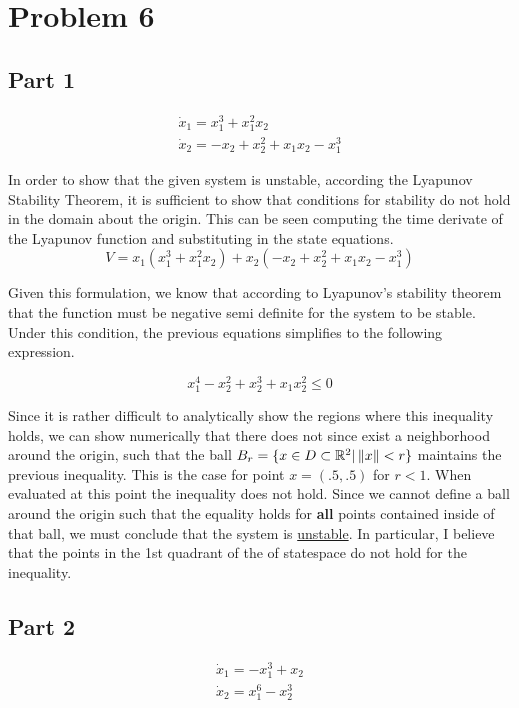 \section{Problem 6}

\subsection*{Part 1}
$$
\begin{array}{l}
\dot{x}_{1}=x_{1}^{3}+x_{1}^{2} x_{2} \\
\dot{x}_{2}=-x_{2}+x_{2}^{2}+x_{1} x_{2}-x_{1}^{3}
\end{array}
$$

\noindent In order to show that the given system is unstable, according the Lyapunov Stability Theorem, it is sufficient to show that conditions for stability do not hold in the domain about the origin. This can be seen computing the time derivate of the Lyapunov function and substituting in the state equations.
$$
V=x_{1}\left(x_{1}^{3}+x_{1}^{2} x_{2}\right)+x_{2}\left(-x_{2}+x_{2}^{2}+x_{1} x_{2}-x_{1}^{3}\right)
$$

\noindent Given this formulation, we know that according to Lyapunov's stability theorem that the function must be negative semi definite for the system to be stable. Under this condition, the previous equations simplifies to the following expression.

$$
x_{1}^{4}-x_{2}^{2}+x_{2}^{3}+x_{1} x_{2}^{2} \leq 0
$$

\noindent Since it is rather difficult to analytically show the regions where this inequality holds, we can show numerically that there does not since exist a neighborhood around the origin, such that the ball $B_r = \{ x \in D \subset \mathbb{R}^2 | \left\Vert x \right\Vert < r \}$ maintains the previous inequality. This is the case for point $x = (.5, .5)$ for $r <1$. When evaluated at this point the inequality does not hold. Since we cannot define a ball around the origin such that the equality holds for \textbf{all} points contained inside of that ball, we must conclude that the system is \underline{unstable}.  In particular, I believe that the points in the 1st quadrant of the of statespace do not hold for the inequality. 

\subsection*{Part 2}


$$
\begin{array}{l}
\dot{x}_{1}=-x_{1}^{3}+x_{2} \\
\dot{x}_{2}=x_{1}^{6}-x_{2}^{3}
\end{array}
$$
